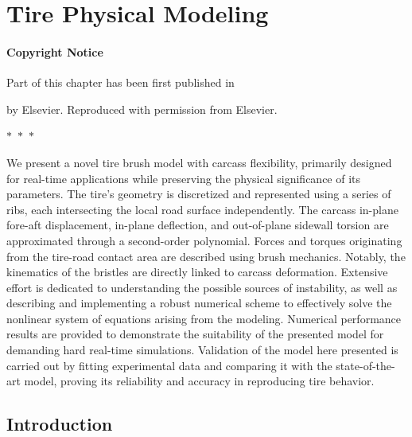 
\chapter{Tire Physical Modeling}
\label{chap4:tire_physical_model}

\subsubsection*{Copyright Notice}
Part of this chapter has been first published in
%
\begin{center}
  \begin{minipage}{0.9\textwidth}
  \end{minipage}
\end{center}
%
by Elsevier. Reproduced with permission from Elsevier.

\begin{center}
  $\ast$~$\ast$~$\ast$
\end{center}

We present a novel tire brush model with carcass flexibility, primarily designed for real-time applications while preserving the physical significance of its parameters. The tire's geometry is discretized and represented using a series of ribs, each intersecting the local road surface independently. The carcass in-plane fore-aft displacement, in-plane deflection, and out-of-plane sidewall torsion are approximated through a second-order polynomial. Forces and torques originating from the tire-road contact area are described using brush mechanics. Notably, the kinematics of the bristles are directly linked to carcass deformation. Extensive effort is dedicated to understanding the possible sources of instability, as well as describing and implementing a robust numerical scheme to effectively solve the nonlinear system of equations arising from the modeling. Numerical performance results are provided to demonstrate the suitability of the presented model for demanding hard real-time simulations.   Validation of the model here presented is carried out by fitting experimental data and comparing it with the state-of-the-art \MagicFormulae{} model, proving its reliability and accuracy in reproducing tire behavior.


\section{Introduction}
\label{chap4:sec:introduction}


